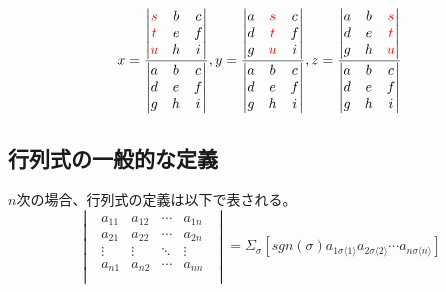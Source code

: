 \documentclass[]{ltjsarticle}%
\begin{document}
\begin{equation}
  \label{eq:eq0205}
  x =
  \frac{
    \begin{vmatrix}
      \textcolor{red}{s} & b & c \\
      \textcolor{red}{t} & e & f \\
      \textcolor{red}{u} & h & i \\
    \end{vmatrix}
  }
  {
    \begin{vmatrix}
      a & b & c \\
      d & e & f \\
      g & h & i \\
    \end{vmatrix}
  },
  y =
  \frac{
    \begin{vmatrix}
      a & \textcolor{red}{s} & c \\
      d & \textcolor{red}{t} & f \\
      g & \textcolor{red}{u} & i \\
    \end{vmatrix}
  }
  {
    \begin{vmatrix}
      a & b & c \\
      d & e & f \\
      g & h & i \\
    \end{vmatrix}
  },
  z =
  \frac{
    \begin{vmatrix}
      a & b & \textcolor{red}{s} \\
      d & e & \textcolor{red}{t} \\
      g & h & \textcolor{red}{u} \\
    \end{vmatrix}
  }
  {
    \begin{vmatrix}
      a & b & c \\
      d & e & f \\
      g & h & i \\
    \end{vmatrix}
  }
\end{equation}

\subsection{行列式の一般的な定義}
\(n\)次の場合、行列式の定義は以下で表される。
\begin{equation}
  \label{eq:eq020201}
  \begin{vmatrix}
    \begin{array}{rrcr}
      a_{11} & a_{12} & \cdots & a_{1n} \\
      a_{21} & a_{22} & \cdots & a_{2n} \\
      \vdots & \vdots & \ddots & \vdots \\
      a_{n1} & a_{n2} & \cdots & a_{nn} \\
    \end{array}
  \end{vmatrix}
  =
  \Sigma_{\sigma}[sgn(\sigma) a_{1\sigma\langle 1\rangle} a_{2\sigma\langle 2\rangle} \cdots a_{n\sigma\langle n\rangle}]
\end{equation}
\end{document}
